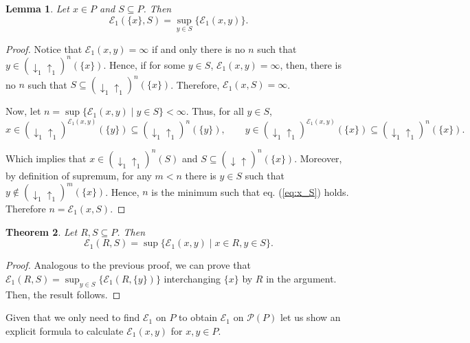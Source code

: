 \documentclass{article}[12pt]
\theoremstyle{exampstyle}
\newtheorem{theorem}{Theorem}[section]
\newtheorem{lemma}[theorem]{Lemma}
\theoremstyle{remark}
\newcommand{\E}{\mathcal{E}}
\renewcommand{\P}{\mathcal{P}}
\newcommand{\updown}[1][]{\downarrow_{#1} \uparrow_{#1}}
\begin{document}
\begin{lemma}
    Let $x \in P$ and $S \subseteq P $. Then
    \begin{equation*}
        \E_1(\{x\},S) = \sup_{y \in S} \{ \E_1(x,y) \}.
    \end{equation*}
\end{lemma}
\begin{proof}

    Notice that $\E_1(x,y) =  \infty$ if and only there is no $n$ such that $y \in (\updown[1])^n(\{x\})$. Hence, if for some $y \in S$, $\E_1(x,y) =  \infty$, then, there is no $n$ such that $S \subseteq (\updown[1])^n(\{x\})$. Therefore, $\E_1(x,S) = \infty$.

    Now, let $n = \sup\{ \E_1(x,y) \mid  y \in S \} < \infty$. Thus, for all $y \in S$, 
    \begin{equation}
        x \in (\updown[1])^{\E_1(x,y)}(\{y\}) \subseteq (\updown[1])^{n}(\{y\}), \qquad y \in (\updown[1])^{\E_1(x,y)}(\{x\}) \subseteq (\updown[1])^{n}(\{x\}).
        \label{eq:x_S}
    \end{equation}
    
    Which implies that $x \in (\updown[1])^{n}(S) $ and $S \subseteq (\updown)^{n}(\{x\})$. Moreover, by definition of supremum, for any $m< n$ there is $y \in S$ such that $y \notin  (\updown[1])^{m}(\{x\})$. Hence, $n$ is the minimum such that eq. (\ref{eq:x_S}) holds. Therefore $n = \E_1(x,S) $.
\end{proof}

\begin{theorem}
    Let $R,S \subseteq P $. Then
    \begin{equation*}
        \E_1(R,S) = \sup\{ \E_1(x,y) \mid  x \in R, y \in S \}.
    \end{equation*}
    \label{th:distance_subsets}
\end{theorem}
\begin{proof}
   Analogous to the previous proof, we can prove that 
        $\displaystyle \E_1(R,S) = \sup_{y \in S}\{ \E_1(R,\{y\})\}$ interchanging $\{ x \}$ by $R$ in the argument. Then, the result follows.
\end{proof}

Given that we only need to find $\E_1$ on $P$ to obtain $\E_1$ on $\P(P)$ let us show an explicit formula to calculate $\E_1(x,y)$ for $x,y \in P$.
\end{document}
